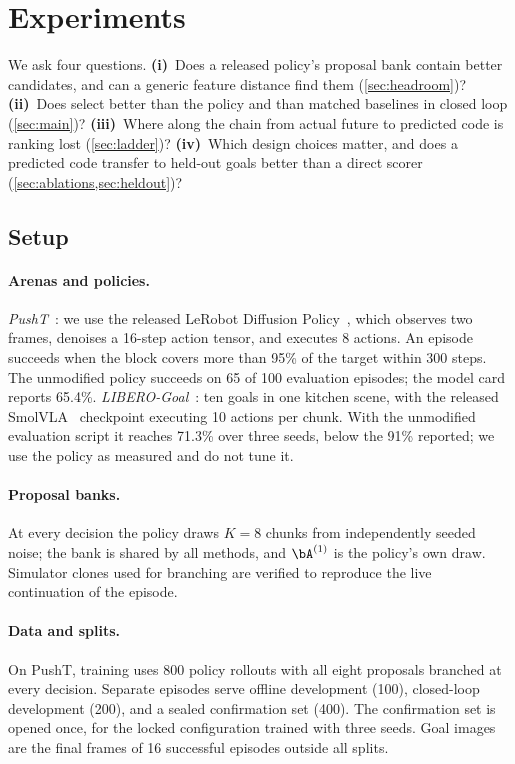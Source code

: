 \section{Experiments}
\label{sec:experiments}

We ask four questions.
\textbf{(i)}~Does a released policy's proposal bank contain better candidates, and can a generic feature distance find them (\cref{sec:headroom})?
\textbf{(ii)}~Does \method select better than the policy and than matched baselines in closed loop (\cref{sec:main})?
\textbf{(iii)}~Where along the chain from actual future to predicted code is ranking lost (\cref{sec:ladder})?
\textbf{(iv)}~Which design choices matter, and does a predicted code transfer to held-out goals better than a direct scorer (\cref{sec:ablations,sec:heldout})?

\subsection{Setup}
\label{sec:setup}

\paragraph{Arenas and policies.}
\emph{PushT}~\cite{florence2021ibc}: we use the released LeRobot Diffusion Policy~\cite{chi2023diffusion}, which observes two frames, denoises a 16-step action tensor, and executes 8 actions.
An episode succeeds when the block covers more than 95\% of the target within 300 steps.
The unmodified policy succeeds on 65 of 100 evaluation episodes; the model card reports 65.4\%.
\emph{LIBERO-Goal}~\cite{liu2023libero}: ten goals in one kitchen scene, with the released SmolVLA~\cite{shukor2025smolvla} checkpoint executing 10 actions per chunk.
With the unmodified evaluation script it reaches 71.3\% over three seeds, below the 91\% reported; we use the policy as measured and do not tune it.

\paragraph{Proposal banks.}
At every decision the policy draws $K{=}8$ chunks from independently seeded noise; the bank is shared by all methods, and $\bA^{(1)}$ is the policy's own draw.
Simulator clones used for branching are verified to reproduce the live continuation of the episode.

\paragraph{Data and splits.}
On PushT, training uses 800 policy rollouts with all eight proposals branched at every decision.
Separate episodes serve offline development (100), closed-loop development (200), and a sealed confirmation set (400).
The confirmation set is opened once, for the locked configuration trained with three seeds.
Goal images are the final frames of 16 successful episodes outside all splits.

